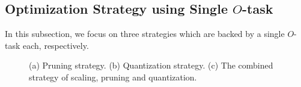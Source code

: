 





\subsection{Optimization Strategy using Single $O$-task}\label{sec:single_opt}


In this subsection, we focus on three strategies which are backed by a single $O$-task each, respectively. %

 


% 
\begin{figure} 
   \centering
   \hspace*{\fill}
  \hspace*{\fill}
 \hspace*{\fill}
  \caption{(a) Pruning strategy. (b) Quantization strategy. (c) The combined strategy of scaling, pruning and quantization. }
  \label{fig:design_flow} 
\end{figure}









